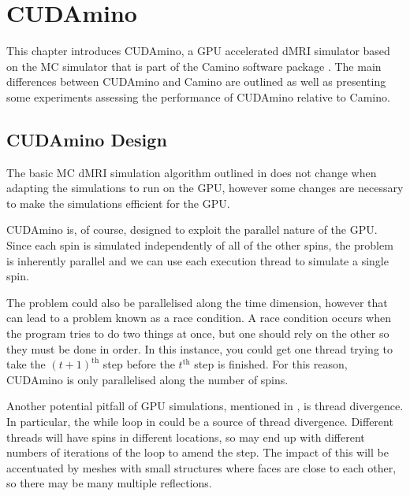 \chapter{CUDAmino}
\label{sec:cudamino}

\chaptertoc{}

\begin{chapterabstract}
  This chapter introduces CUDAmino, a \ac{GPU} accelerated \ac{dMRI} simulator based on the \ac{MC} simulator that is part of the Camino software package \cite{Cook2006,Hall2009}.
  The main differences between CUDAmino and Camino are outlined as well as presenting some experiments assessing the performance of CUDAmino relative to Camino.
\end{chapterabstract}


\section{CUDAmino Design}
\label{sec:cudamino_design}
The basic \acl{MC} \ac{dMRI} simulation algorithm outlined in  does not change when adapting the simulations to run on the \ac{GPU}, however some changes are necessary to make the simulations efficient for the \ac{GPU}.

CUDAmino is, of course, designed to exploit the parallel nature of the \ac{GPU}.
Since each spin is simulated independently of all of the other spins, the problem is inherently parallel and we can use each execution thread to simulate a single spin.

The problem could also be parallelised along the time dimension, however that can lead to a problem known as a race condition.
A race condition occurs when the program tries to do two things at once, but one should rely on the other so they must be done in order.
In this instance, you could get one thread trying to take the $(t+1)^{\mathrm{th}}$ step before the $t^{\mathrm{th}}$ step is finished.
For this reason, CUDAmino is only parallelised along the number of spins.

Another potential pitfall of GPU simulations, mentioned in , is thread divergence.
In particular, the while loop in  could be a source of thread divergence.
Different threads will have spins in different locations, so may end up with different numbers of iterations of the loop to amend the step.
The impact of this will be accentuated by meshes with small structures where faces are close to each other, so there may be many multiple reflections.


